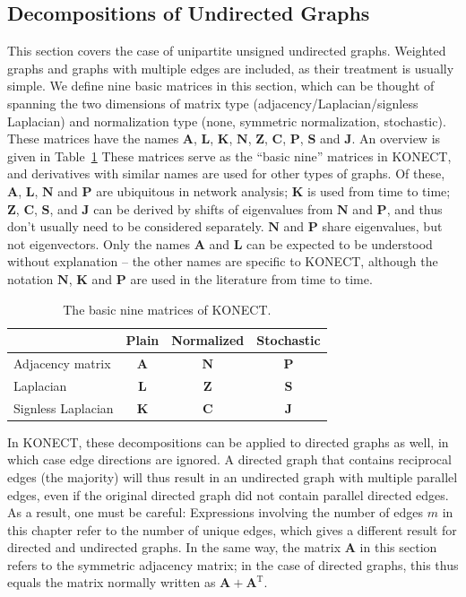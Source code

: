 \documentclass{article}
\begin{document}
\subsection{Decompositions of Undirected Graphs}
This section covers the case of unipartite unsigned undirected graphs.
Weighted graphs and graphs with multiple edges are included, as their
treatment is usually simple. 
We define nine basic matrices in this section, which can be thought of
spanning the two dimensions of matrix type (adjacency/Laplacian/signless
Laplacian) and normalization type (none, symmetric normalization,
stochastic).  These matrices have the names $\mathbf A$, $\mathbf L$,
$\mathbf K$, $\mathbf N$, $\mathbf Z$, $\mathbf C$, $\mathbf P$,
$\mathbf S$ and $\mathbf J$.  
An overview is given in Table~\ref{tab:basic-nine}
These matrices serve as the ``basic nine'' matrices
in KONECT, and derivatives with similar names are used for other types
of graphs.  Of these, $\mathbf A$, $\mathbf L$, $\mathbf N$ and $\mathbf
P$ are
ubiquitous in network analysis; $\mathbf K$ is
used from time to time; $\mathbf Z$, $\mathbf C$, $\mathbf S$,
and $\mathbf J$ can be derived by shifts of eigenvalues from $\mathbf N$
and $\mathbf P$, and thus don't usually need to be considered
separately.  $\mathbf N$ and $\mathbf P$ share eigenvalues, but not
eigenvectors.  Only the names $\mathbf A$ and $\mathbf L$ can be
expected to be understood without explanation -- the other names are
specific to KONECT, although the notation $\mathbf N$, $\mathbf K$ and
$\mathbf P$ are used in the literature from time to time. 

\begin{table}
  \caption{
    \label{tab:basic-nine}
    The basic nine matrices of KONECT.
  }
  \centering
  \begin{tabular}{ l @{\qquad\qquad} c @{\qquad\quad} c c }
    \toprule
    & \textbf{Plain} & \textbf{Normalized} & \textbf{Stochastic} \\
    \midrule
    Adjacency matrix & $\mathbf A$ & $\mathbf N$ & $\mathbf P$ \\
    Laplacian        & $\mathbf L$ & $\mathbf Z$ & $\mathbf S$ \\
    Signless Laplacian & $\mathbf K$ & $\mathbf C$ & $\mathbf J$ \\
    \bottomrule 
  \end{tabular}
\end{table}

In KONECT, these decompositions can be applied to directed graphs as well, in
which case edge directions are ignored.  A directed graph that contains
reciprocal edges (the majority) will thus result in an undirected graph
with multiple parallel edges, even if the original directed graph did
not contain parallel directed edges.  As a result, one must be careful:
Expressions involving the number of edges $m$ in this chapter refer
to the number of unique edges, which gives a different result for
directed and undirected graphs.  In the same way, the matrix $\mathbf A$
in this section refers to the symmetric adjacency matrix; in the case of
directed graphs, this thus equals the matrix normally written as
$\mathbf A + \mathbf A^{\mathrm T}$. 
\end{document}
